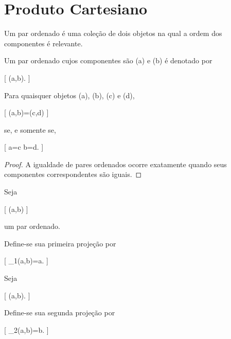 \documentclass[../../main]{subfiles}
\begin{document}
\section{Produto Cartesiano}
\label{sec:matematica:teoria-conjuntos:produto-cartesiano}

\begin{defn}
	\label{def:matematica:teoria-conjuntos:produto-cartesiano:par-ordenado}

	Um par ordenado é uma coleção de dois objetos na qual a ordem dos
	componentes é relevante.

	Um par ordenado cujos componentes são (a) e (b) é denotado por

		[
			(a,b).
		]

\end{defn}

\begin{prop}
	\label{prop:matematica:teoria-conjuntos:produto-cartesiano:igualdade-pares}

	Para quaisquer objetos (a), (b), (c) e (d),

	[
			(a,b)=(c,d)
		]

	se, e somente se,

	[
			a=c
			\quad\text{e}\quad
			b=d.
		]

\end{prop}

\begin{proof}

	A igualdade de pares ordenados ocorre exatamente quando seus
	componentes correspondentes são iguais.

\end{proof}

\begin{defn}
	\label{def:matematica:teoria-conjuntos:produto-cartesiano:primeira-projecao}

	Seja

		[
			(a,b)
		]

	um par ordenado.

	Define-se sua primeira projeção por

		[
			\pi_1(a,b)=a.
		]

\end{defn}

\begin{defn}
	\label{def:matematica:teoria-conjuntos:produto-cartesiano:segunda-projecao}

	Seja

		[
			(a,b).
		]

	Define-se sua segunda projeção por

		[
			\pi_2(a,b)=b.
		]

\end{defn}
\end{document}
